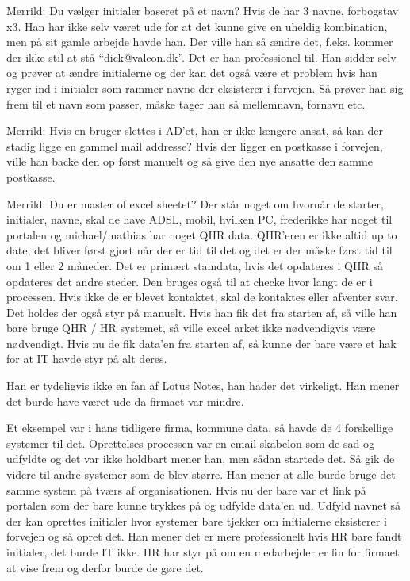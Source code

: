 Merrild: Du vælger initialer baseret på et navn?
Hvis de har 3 navne, forbogstav x3. Han har ikke selv været ude for at det kunne give en uheldig kombination, men på sit gamle arbejde havde han. Der ville han så ændre det, f.eks. kommer der ikke stil at stå “dick@valcon.dk”. Det er han professionel til. Han sidder selv og prøver at ændre initialerne og der kan det også være et problem hvis han ryger ind i initialer som rammer navne der eksisterer i forvejen. Så prøver han sig frem til et navn som passer, måske tager han så mellemnavn, fornavn etc. 

Merrild: Hvis en bruger slettes i AD’et, han er ikke længere ansat, så kan der stadig ligge en gammel mail addresse? 
Hvis der ligger en postkasse i forvejen, ville han backe den op først manuelt og så give den nye ansatte den samme postkasse.

Merrild: Du er master of excel sheetet?
Der står noget om hvornår de starter, initialer, navne, skal de have ADSL, mobil, hvilken PC, frederikke har noget til portalen og michael/mathias har noget QHR data. QHR’eren er ikke altid up to date, det bliver først gjort når der er tid til det og det er der måske først tid til om 1 eller 2 måneder. Det er primært stamdata, hvis det opdateres i QHR så opdateres det andre steder. 
Den bruges også til at checke hvor langt de er i processen. Hvis ikke de er blevet kontaktet, skal de kontaktes eller afventer svar. Det holdes der også styr på manuelt. Hvis han fik det fra starten af, så ville han bare bruge QHR / HR systemet, så ville excel arket ikke nødvendigvis være nødvendigt. Hvis nu de fik data’en fra starten af, så kunne der bare være et hak for at IT havde styr på alt deres.

Han er tydeligvis ikke en fan af Lotus Notes, han hader det virkeligt. Han mener det burde have været ude da firmaet var mindre. 

Et eksempel var i hans tidligere firma, kommune data, så havde de 4 forskellige systemer til det. Oprettelses processen var en email skabelon som de sad og udfyldte og det var ikke holdbart mener han, men sådan startede det. Så gik de videre til andre systemer som de blev større. Han mener at alle burde bruge det samme system på tværs af organisationen. Hvis nu der bare var et link på portalen som der bare kunne trykkes på og udfylde data’en ud. Udfyld navnet så der kan oprettes initialer hvor systemer bare tjekker om initialerne eksisterer i forvejen og så opret det. Han mener det er mere professionelt hvis HR bare fandt initialer, det burde IT ikke. HR har styr på om en medarbejder er fin for firmaet at vise frem og derfor burde de gøre det.

